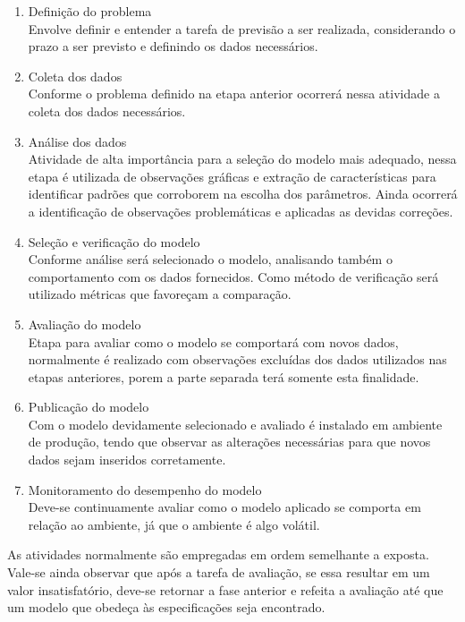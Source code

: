 \documentclass[
    12pt,
    oneside,
    a4paper,
    english,
    brazil
]{abntex2}
\begin{document}
\begin{enumerate}
    \item Definição do problema\\
        Envolve definir e entender a tarefa de previsão a ser realizada,
        considerando o prazo a ser previsto e definindo os dados necessários.
    \item Coleta dos dados\\
        Conforme o problema definido na etapa anterior ocorrerá nessa atividade
        a coleta dos dados necessários.
    \item Análise dos dados\\
        Atividade de alta importância para a seleção do modelo mais adequado,
        nessa etapa é utilizada de observações gráficas e extração de
        características para identificar padrões que corroborem na escolha dos
        parâmetros. Ainda ocorrerá a identificação de observações problemáticas
        e aplicadas as devidas correções.
    \item Seleção e verificação do modelo\\
        Conforme análise será selecionado o modelo, analisando também o
        comportamento com os dados fornecidos. Como método de verificação será
        utilizado métricas que favoreçam a comparação.
    \item Avaliação do modelo\\
        Etapa para avaliar como o modelo se comportará com novos dados,
        normalmente é realizado com observações excluídas dos dados utilizados
        nas etapas anteriores, porem a parte separada terá somente esta
        finalidade.
    \item Publicação do modelo\\
        Com o modelo devidamente selecionado e avaliado é instalado em ambiente
        de produção, tendo que observar as alterações necessárias para que novos
        dados sejam inseridos corretamente.
    \item Monitoramento do desempenho do modelo\\
        Deve-se continuamente avaliar como o modelo aplicado se comporta em
        relação ao ambiente, já que o ambiente é algo volátil.
\end{enumerate}

As atividades normalmente são empregadas em ordem semelhante a exposta. Vale-se
ainda observar que após a tarefa de avaliação, se essa resultar em um valor
insatisfatório, deve-se retornar a fase anterior e refeita a avaliação até que
um modelo que obedeça às especificações seja encontrado.
\end{document}
